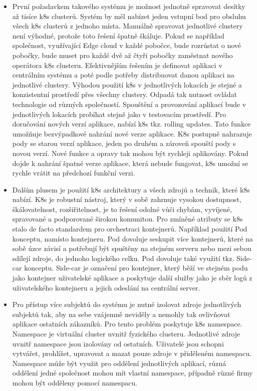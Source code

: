 \begin{itemize}
\item První požadavkem takového systému je možnost jednotně spravovat desítky až tisíce k8s clusterů. Systém by měl nabízet jeden vstupní bod pro obsluhu všech k8s clusterů z jednoho místa.  Manuálně spravovat jednotlivé clustery není \linebreak výhodné, protože toto řešení špatně škáluje. Pokud se například společnost, \linebreak využívající Edge cloud v každé pobočce, bude rozrůstat o nové pobočky, bude muset pro každé dvě až čtyři pobočky zaměstnat nového operátora k8s clusteru. Efektivnějším řešením je definovat aplikaci v centrálním systému a poté podle potřeby distribuovat danou aplikaci na jednotlivé clustery. Výhodou použití k8s v jednotlivých lokacích je stejné a konzistentní prostředí přes všechny clustery. Odpadá tak nutnost ovládat technologie od různých společností. Spouštění a provozování aplikací bude v jednotlivých lokacích probíhat stejně jako v testovacím prostředí. Pro doručování nových verzí aplikace, nabízí k8s tkz. rolling updates. Tato funkce umožňuje bezvýpadkové nahrání nové verze aplikace. K8s postupně nahrazuje pody se starou verzí aplikace, jeden po druhém a zároveň spouští pody s novou verzí. Nové funkce a opravy tak mohou být rychleji aplikovány. Pokud dojde k nahrání špatné verze aplikace, která nebude fungovat, k8s umožní se rychle vrátit na předchozí funkční verzi. 
\item     Dalším plusem je použití k8s architektury a všech zdrojů a technik, které k8s nabízí. K8s je robustní nástroj, který v sobě zahrnuje vysokou dostupnost, škálovatelnost, rozšiřitelnost, je to řešení odolné vůči chybám, vyvíjené, spravované a podporované širokou komunitou. Pro zmíněné atributy se k8s stalo de facto standardem pro orchestraci kontejnerů. Například použití Pod konceptu, namísto kontejneru. Pod dovoluje seskupit více kontejnerů, které na sobě úzce závisí a potřebují být spuštěny na stejném serveru nebo mezi sebou sdílejí zdroje, do jednoho logického celku. Pod dovoluje také využití tkz. Side-car konceptu. Side-car je označení pro kontejner, který běží ve stejném podu jako kontejner uživatelské aplikace a poskytuje další služby jako je sběr logů z uživatelského kontejneru a jejich odeslání na centrální server. 
\item Pro přístup více subjektů do systému je nutné izolovat zdroje jednotlivých subjektů tak, aby na sebe vzájemně neviděly a nemohly tak ovlivňovat aplikace ostatních zákazníků. Pro tento problém poskytuje k8s namespace. Namespace je virtuální cluster uvnitř fyzického clusteru. Jednotlivé zdroje uvnitř namespace jsou izolovány od ostatních. Uživatelé jsou schopni vytvářet, prohlížet, upravovat a mazat pouze zdroje v přiděleném namespacu. Namespace může být využit pro oddělení jednotlivých aplikací, různá oddělení jedné společnost mohou mít vlastní namespace, případně různé firmy mohou být odděleny pomocí namespacu. 

\end{itemize}
